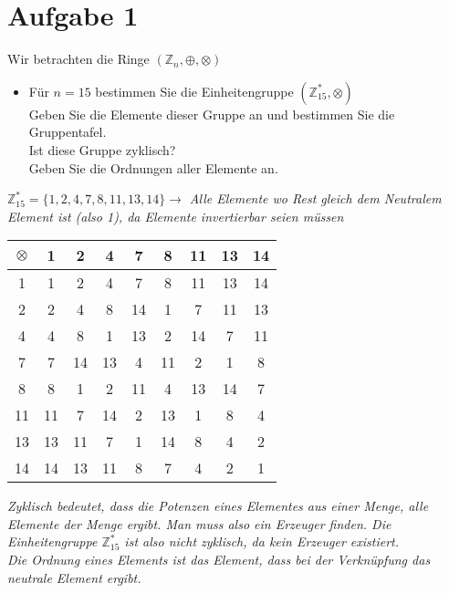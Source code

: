 \section*{Aufgabe 1}

Wir betrachten die Ringe $(\mathbb{Z}_n, \oplus, \otimes)$

\begin{itemize}[leftmargin=*, label={a)}]
\item Für $n = 15$ bestimmen Sie die Einheitengruppe $(\mathbb{Z}^{*}_{15}, \otimes)$\\
Geben Sie die Elemente dieser Gruppe an und bestimmen Sie die Gruppentafel.\\
Ist diese Gruppe zyklisch?\\
Geben Sie die Ordnungen aller Elemente an.
\end{itemize}

$\mathbb{Z}^{*}_{15} = \{1, 2, 4, 7, 8, 11, 13, 14\} \rightarrow$ \textit{Alle Elemente wo Rest gleich dem Neutralem Element ist (also 1), da Elemente invertierbar seien müssen}\\

\begin{table}[h]
\centering
\begin{tabular}{c|cccccccc}
$\otimes$ & 1 & 2 & 4 & 7 & 8 & 11 & 13 & 14\\
\hline
1  &  1 &  2 &  4 &  7 &  8 & 11 & 13 & 14\\
2  &  2 &  4 &  8 & 14 &  1 &  7 & 11 & 13\\
4  &  4 &  8 &  1 & 13 &  2 & 14 &  7 & 11\\
7  &  7 & 14 & 13 &  4 & 11 &  2 &  1 & 8\\
8  &  8 &  1 &  2 & 11 &  4 & 13 & 14 & 7\\
11 & 11 &  7 & 14 &  2 & 13 &  1 &  8 & 4\\
13 & 13 & 11 &  7 &  1 & 14 &  8 &  4 & 2\\
14 & 14 & 13 & 11 &  8 &  7 &  4 &  2 & 1
\end{tabular}
\end{table}

\textit{Zyklisch bedeutet, dass die Potenzen eines Elementes aus einer Menge, alle Elemente der Menge ergibt. Man muss also ein Erzeuger finden. Die Einheitengruppe $\mathbb{Z}^{*}_{15}$ ist also nicht zyklisch, da kein Erzeuger existiert.}\\

\textit{Die Ordnung eines Elements ist das Element, dass bei der Verknüpfung das neutrale Element ergibt.}

